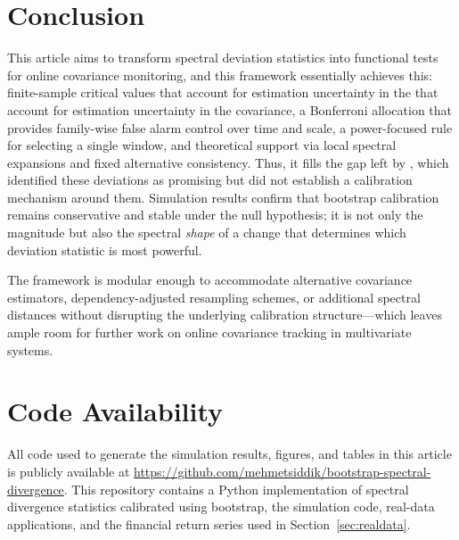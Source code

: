 \documentclass[11pt,a4paper]{article}
\begin{document}
\section{Conclusion}
\label{sec:conclusion}

This article aims to transform spectral deviation statistics into
functional tests for online covariance monitoring, and this framework essentially
achieves this: finite-sample critical values that account for estimation uncertainty in the
that account for estimation uncertainty in the covariance, a Bonferroni allocation that provides
family-wise false alarm control over time and scale, a power-focused rule for selecting
a single window, and theoretical support via local spectral expansions and fixed alternative
consistency. Thus, it fills the gap left by
\citet{erdtman2023}, which identified these deviations as promising but
did not establish a calibration mechanism around them. Simulation results
confirm that bootstrap calibration
remains conservative and stable under the null hypothesis; it is not only the magnitude but also the spectral \emph{shape} of a change
that determines which deviation statistic is most powerful.

The framework is modular enough to accommodate alternative covariance
estimators, dependency-adjusted resampling schemes, or additional spectral
distances without disrupting the underlying calibration structure—which
leaves ample room for further work on online covariance tracking
in multivariate systems.

\section*{Code Availability}

All code used to generate the simulation results, figures, and tables in this article
is publicly available at \url{https://github.com/mehmetsiddik/bootstrap-spectral-divergence}.
This repository contains a Python implementation of spectral divergence statistics calibrated using bootstrap,
the simulation code, real-data applications, and the financial return series used in Section~\ref{sec:realdata}.




\appendix
\end{document}
